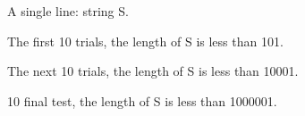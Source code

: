 A single line: string S.

The first 10 trials, the length of S is less than 101.

The next 10 trials, the length of S is less than 10001.

10 final test, the length of S is less than 1000001.